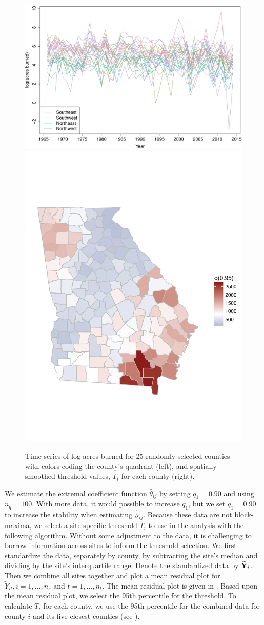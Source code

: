 \begin{figure}[htbp]  %
  \centering
  \includegraphics[width=0.55\linewidth]{plots/fire-spag-rand-25}
  \includegraphics[width=0.44\linewidth, trim = 0 8em 0 10em]{plots/fire-spatial-q95.pdf}
  \caption{Time series of log acres burned for 25 randomly selected counties with colors coding the county's quadrant (left), and spatially smoothed threshold values, $T_i$ for each county (right).}
  \label{ebfig:firets25}
\end{figure}

We estimate the extremal coefficient function $\hat{\theta}_{ij}$ by setting $q_1 = 0.90$ and using $n_q = 100$.
With more data, it would possible to increase $q_1$, but we set $q_1 = 0.90$ to increase the stability when estimating $\hat{\vartheta}_{ij}$.
Because these data are not block-maxima, we select a site-specific threshold $T_i$ to use in the analysis with the following algorithm.
Without some adjustment to the data, it is challenging to borrow information across sites to inform the threshold selection.
We first standardize the data, separately by county, by subtracting the site's median and dividing by the site's interquartile range.
Denote the standardized data by $\widetilde{\mathbf{Y}}_i$.
Then we combine all sites together and plot a mean residual plot for $\widetilde{Y}_{it}, i = 1, \ldots, n_s$ and $t = 1, \ldots, n_t$.
The mean residual plot is given in .
Based upon the mean residual plot, we select the 95th percentile for the threshold.
To calculate $T_i$ for each county, we use the 95th percentile for the combined data for county $i$ and its five closest counties (see ).

